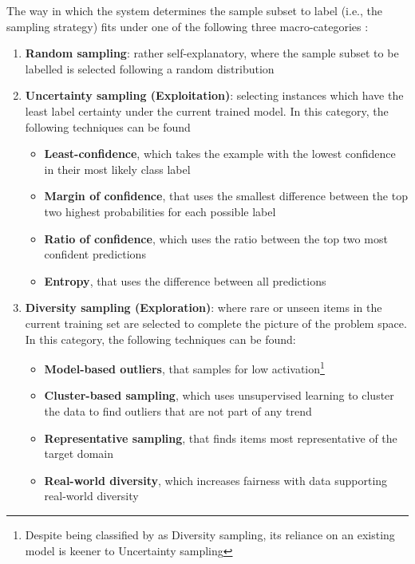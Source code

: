 \documentclass{scrartcl}
\begin{document}
  The way in which the system determines the sample subset to label (i.e., the sampling strategy) fits under one of the following three macro-categories \autocite{monarch2021human,hills2015exploration}:
  \begin{enumerate}
    \item \textbf{Random sampling}: rather self-explanatory, where the sample subset to be labelled is selected following a random distribution
    \item \textbf{Uncertainty sampling (Exploitation)}: selecting instances which have the least label certainty under the current trained model. In this category, the following techniques can be found
    \begin{itemize}
      \item \textbf{Least-confidence}, which takes the example with the lowest confidence in their most likely class label
      \item \textbf{Margin of confidence}, that uses the smallest difference between the top two highest probabilities for each possible label
      \item \textbf{Ratio of confidence}, which uses the ratio between the top two most confident predictions
      \item \textbf{Entropy}, that uses the difference between all predictions
    \end{itemize}
    \item \textbf{Diversity sampling (Exploration)}: where rare or unseen items in the current training set are selected to complete the picture of the problem space. In this category, the following techniques can be found:
    \begin{itemize}
      \item \textbf{Model-based outliers}, that samples for low activation\footnote{Despite being classified by \textcite{hills2015exploration} as Diversity sampling, its reliance on an existing model is keener to Uncertainty sampling}
      \item \textbf{Cluster-based sampling}, which uses unsupervised learning to cluster the data to find outliers that are not part of any trend
      \item \textbf{Representative sampling}, that finds items most representative of the target domain
      \item \textbf{Real-world diversity}, which increases fairness with data supporting real-world diversity
    \end{itemize}
  \end{enumerate}
\end{document}
